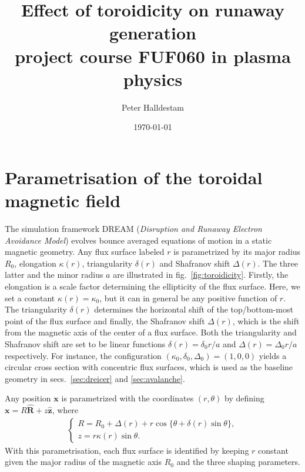 \documentclass[11pt,a4paper]{article}
\title{Effect of toroidicity on runaway generation\\\vspace{.3cm} \large{project course FUF060 in plasma physics}}
\author{Peter Halldestam}
\date{\today}
\renewcommand{\vec}[1]{\boldsymbol{#1}}
\begin{document}
\maketitle


\section{Parametrisation of the toroidal magnetic field}
\label{sec:param}
The simulation framework \textsc{DREAM} (\textit{Disruption and Runaway Electron Avoidance Model}) evolves bounce averaged equations of motion in a static magnetic geometry.
Any flux surface labeled $r$ is parametrized by its major radius $R_0$, elongation $\kappa(r)$, triangularity $\delta(r)$ and Shafranov shift $\Delta(r)$.
The three latter and the minor radius $a$ are illustrated in fig.\ \ref{fig:toroidicity}.
Firstly, the elongation is a scale factor determining the ellipticity of the flux surface.
Here, we set a constant $\kappa(r)=\kappa_0$, but it can in general be any positive function of $r$.
The triangularity $\delta(r)$ determines the horizontal shift of the top/bottom-most point of the flux surface and finally, the Shafranov shift $\Delta(r)$, which is the shift from the magnetic axis of the center of a flux surface.
Both the triangularity and Shafranov shift are set to be linear functions $\delta(r)=\delta_0 r/a$ and $\Delta(r)=\Delta_0 r/a$ respectively.
For instance, the configuration $(\kappa_0, \delta_0, \Delta_0)=(1, 0, 0)$ yields a circular cross section with concentric flux surfaces, which is used as the baseline geometry in secs.\ \ref{sec:dreicer} and \ref{sec:avalanche}.

Any position $\vec{x}$ is parametrized with the coordinates $(r, \theta)$ by defining $\vec{x}=R\vec{\hat{R}}+z\vec{\hat{z}}$, where
\begin{align}
    \label{eq:param}
    \begin{cases}
        R
        =R_0+\Delta(r)+r\cos\{\theta+\delta(r)\sin\theta\},\\
        z
        =r\kappa(r)\sin\theta.
    \end{cases}
\end{align}
With this parametrisation, each flux surface is identified by keeping $r$ constant given the major radius of the magnetic axis $R_0$ and the three shaping parameters.\\
\end{document}
